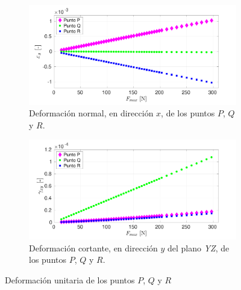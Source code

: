 \begin{figure}[p]
\centering
\ContinuedFloat
	\begin{subfigure}{1\linewidth}
		\centering
		\includegraphics[width=\linewidth, trim={1cm 0cm 2cm 0cm},clip]{Imagenes/def_normal.pdf}
		\caption{Deformación normal, en dirección $x$, de los puntos $P$, $Q$ y $R$.}
		\label{fig:def_normal201}
	\end{subfigure}
		\begin{subfigure}{1\linewidth}
		\centering
		\includegraphics[width=\linewidth, trim={1cm 0cm 2cm 0cm},clip]{Imagenes/def_cortante.pdf}
		\caption{Deformación cortante, en dirección $y$ del plano \textit{YZ}, de los puntos $P$, $Q$ y $R$.}
		\label{fig:def_vm201}
	\end{subfigure}
\caption{Deformación unitaria de los puntos $P$, $Q$ y $R$  }
\label{fig:def_201}
\end{figure}

